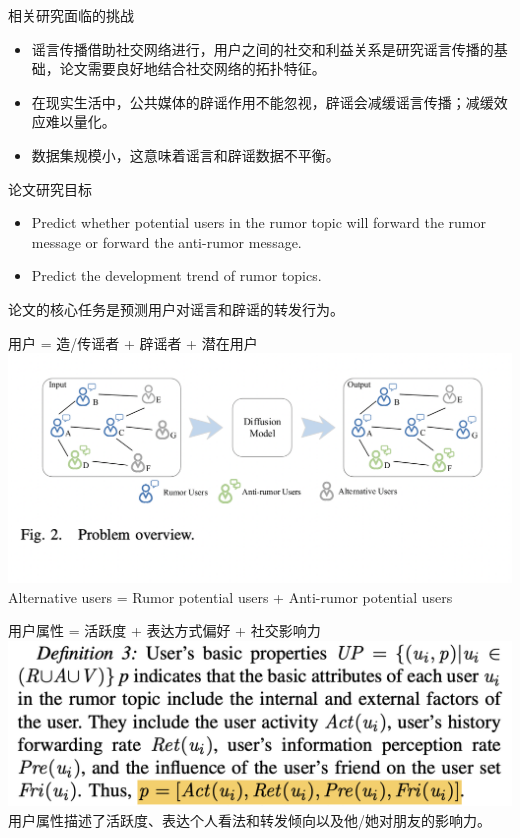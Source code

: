 \documentclass{beamer}
\begin{document}
\begin{frame}{相关研究面临的挑战}
	\begin{itemize}
		\item 谣言传播借助社交网络进行，用户之间的社交和利益关系是研究谣言传播的基础，论文需要良好地结合社交网络的拓扑特征。
		\item 在现实生活中，公共媒体的辟谣作用不能忽视，辟谣会减缓谣言传播；减缓效应难以量化。
		\item 数据集规模小，这意味着谣言和辟谣数据不平衡。
	\end{itemize}
\end{frame}

\begin{frame}{论文研究目标}
	\begin{itemize}
		\item Predict whether potential users in the rumor topic will forward the rumor message or forward the anti-rumor message.
		\item Predict the development trend of rumor topics.
	\end{itemize}
	论文的核心任务是预测用户对谣言和辟谣的转发行为。
\end{frame}

\begin{frame}{用户 = 造/传谣者 + 辟谣者 + 潜在用户}
	\includegraphics[width=\linewidth]{Assets/图2}
	Alternative users = Rumor potential users + Anti-rumor potential users
\end{frame}

\begin{frame}{用户属性 = 活跃度 + 表达方式偏好 + 社交影响力}
	\includegraphics[width=\linewidth]{Assets/定义3.png}
	用户属性描述了活跃度、表达个人看法和转发倾向以及他/她对朋友的影响力。
\end{frame}
\end{document}
